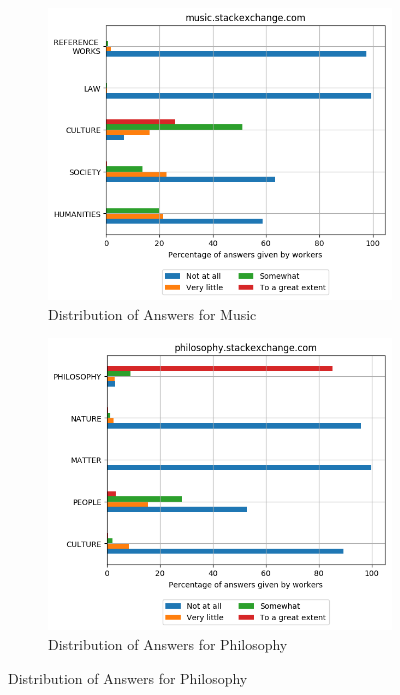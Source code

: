 \begin{figure}[H]
     \begin{subfigure}{0.5\textwidth}
    \centering
        \includegraphics[width=1\linewidth]{imgs/crowd-results/music_stackexchange_com}
        \caption{Distribution of Answers for Music}
        \label{fig:crowd-results-music}
    \end{subfigure}%
    \begin{subfigure}{0.5\textwidth}
    \centering
        \includegraphics[width=1\linewidth]{imgs/crowd-results/philosophy_stackexchange_com}
        \caption{Distribution of Answers for Philosophy}
        \label{fig:crowd-results-philosophy}
    \end{subfigure}
    

\end{figure}
